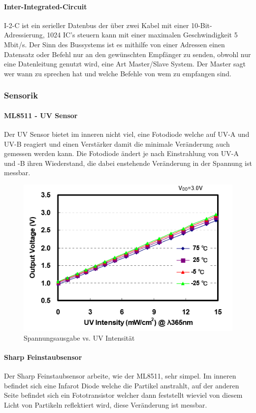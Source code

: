 \paragraph{Inter-Integrated-Circuit}
I-2-C ist ein serieller Datenbus der über zwei Kabel mit einer 10-Bit-Adressierung, 1024 IC's steuern kann mit einer maximalen Geschwindigkeit 5 Mbit/s. Der Sinn des Bussystems ist es mithilfe von einer Adressen einen Datensatz oder Befehl nur an den gewünschten Empfänger zu senden, obwohl nur eine Datenleitung genutzt wird, eine Art Master/Slave System. Der Master sagt wer wann zu sprechen hat und welche Befehle von wem zu empfangen sind.

\subsubsection{Sensorik}
\paragraph{ML8511 - UV Sensor}
Der UV Sensor bietet im inneren nicht viel, eine Fotodiode welche auf UV-A und UV-B reagiert und einen Verstärker damit die minimale Veränderung auch gemessen werden kann. Die Fotodiode ändert je nach Einstrahlung von UV-A und -B ihren Wiederstand, die dabei enstehende Veränderung in der Spannung ist messbar.

\begin{figure}[h]
	\centering
	\includegraphics[scale=0.4]{2_Beschreibung_des_CANSAT/graph_photodiode_response.png}
	\caption{Spannungsausgabe vs. UV Intensität}
	\label{graph photodiode}
\end{figure}


\paragraph{Sharp Feinstaubsensor}
Der Sharp Feinstaubsensor arbeite, wie der ML8511, sehr simpel. Im inneren befindet sich eine Infarot Diode welche die Partikel anstrahlt, auf der anderen Seite befindet sich ein Fototransistor welcher dann feststellt wieviel von diesem Licht von Partikeln reflektiert wird, diese Veränderung ist messbar.


